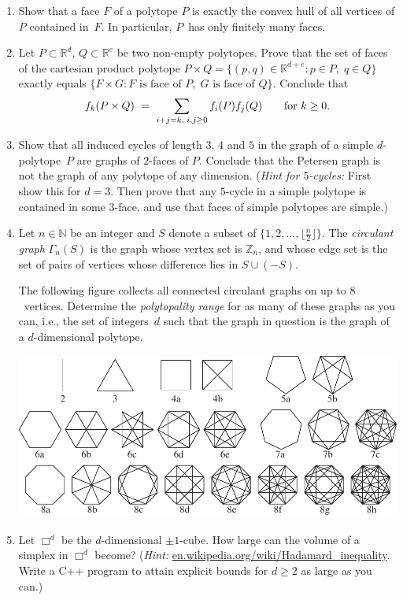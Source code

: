 \documentclass[11pt]{amsart}
\newcommand{\N}{\mathbb{N}}
\newcommand{\R}{\mathbb{R}}
\newcommand{\Z}{\mathbb{Z}}
\begin{document}
\begin{enumerate}

\item Show that a face $F$ of a polytope $P$ is exactly the convex hull of all vertices of $P$ contained in~$F$. 
In particular, $P$~has only finitely many faces.

\item Let $P\subset\R^d$, $Q\subset\R^e$ be two non-empty polytopes. Prove that the set of faces of the cartesian product polytope $P\times Q=\{(p,q)\in\R^{d+e}:p\in P,\; q\in Q\}$ exactly equals $\{F\times G: F\text{ is face of }P, \;G\text{ is face of }Q\}$. Conclude that
\[
    f_k(P\times Q)
    \ = \
    \sum_{%
      i+j=k,\;i,j\ge0}f_i(P) f_j(Q)
    \qquad
    \text{for } k\ge0.
\]

\item Show that all induced cycles of length $3$, $4$ and $5$ in the graph of a simple $d$-polytope~$P$ are graphs of $2$-faces of $P$.
Conclude that the Petersen graph is not the graph of any polytope of any dimension. (\emph{Hint for $5$-cycles:} First show this for $d=3$. Then prove
that any $5$-cycle in a simple polytope is contained in some $3$-face,
and use that faces of  simple polytopes are simple.)

\item Let $n\in\N$ be an integer and $S$ denote a subset of
  $\{1,2,\dots,\lfloor\frac{n}{2}\rfloor\}$.  
  The \emph{circulant graph} $\Gamma_n(S)$ is the graph whose vertex set is $\Z_n$, and whose edge set is the set of pairs of vertices whose difference lies in $S\cup (-S)$. 

The following figure collects all connected circulant graphs on up to $8$~vertices. Determine the \emph{polytopality range} for as many of these graphs as you can, i.e., the set of integers~$d$ such that the graph in question is the graph of a $d$-dimensional polytope.

\bigskip
\includegraphics[width=\linewidth]{circulant}

\item Let $\Box^d$ be the $d$-dimensional $\pm1$-cube. How large can the volume of a simplex in $\Box^d$ become? (\emph{Hint:} \url{en.wikipedia.org/wiki/Hadamard_inequality}. Write a  C++ program to attain explicit bounds for $d\ge2$ as large as you can.)
\end{enumerate}


\end{document}
